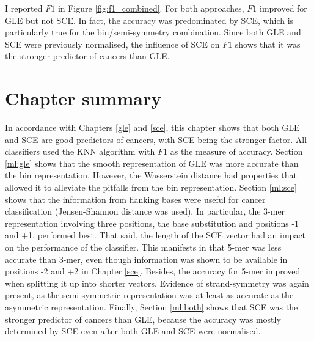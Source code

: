 I reported $F1$ in Figure \ref{fig:f1_combined}. For both approaches, $F1$ improved for GLE but not SCE. In fact, the accuracy was predominated by SCE, which is particularly true for the bin/semi-symmetry combination. Since both GLE and SCE were previously normalised, the influence of SCE on $F1$ shows that it was the stronger predictor of cancers than GLE.



\section{Chapter summary}
In accordance with Chapters \ref{gle} and \ref{sce}, this chapter shows that both GLE and SCE are good predictors of cancers, with SCE being the stronger factor. All classifiers used the KNN algorithm with $F1$ as the measure of accuracy. Section \ref{ml:gle} shows that the smooth representation of GLE was more accurate than the bin representation. However, the Wasserstein distance had properties that allowed it to alleviate the pitfalls from the bin representation. Section \ref{ml:sce} shows that the information from flanking bases were useful for cancer classification (Jensen-Shannon distance was used). In particular, the 3-mer representation involving three positions, the base substitution and positions -1 and +1, performed best. That said, the length of the SCE vector had an impact on the performance of the classifier. This manifests in that 5-mer was less accurate than 3-mer, even though information was shown to be available in positions -2 and +2 in Chapter \ref{sce}. Besides, the accuracy for 5-mer improved when splitting it up into shorter vectors. Evidence of strand-symmetry was again present, as the semi-symmetric representation was at least as accurate as the asymmetric representation. Finally, Section \ref{ml:both} shows that SCE was the stronger predictor of cancers than GLE, because the accuracy was mostly determined by SCE even after both GLE and SCE were normalised.


